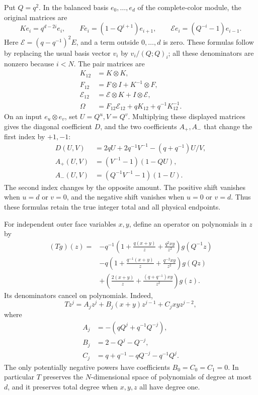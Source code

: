 Put \(Q=q^2\). In the balanced basis \(e_0,\ldots,e_d\) of the
complete-color module, the original matrices are
\[
 K e_i=q^{d-2i}e_i,\qquad
 F e_i=(1-Q^{i+1})e_{i+1},\qquad
 \mathcal E e_i=(Q^{-i}-1)e_{i-1}.
\]
Here \(\mathcal E=(q-q^{-1})^2E\), and a term outside
\(0,\ldots,d\) is zero. These formulas follow by replacing the
usual basis vector \(v_i\) by \(v_i/(Q;Q)_i\); all these
denominators are nonzero because \(i<N\). The pair matrices are
\[
 \begin{split}
 K_{12}&=K\otimes K,\\
 F_{12}&=F\otimes I+K^{-1}\otimes F,\\
 \mathcal E_{12}&=\mathcal E\otimes K+I\otimes\mathcal E,\\
 \Omega&=F_{12}\mathcal E_{12}
                     +qK_{12}+q^{-1}K_{12}^{-1}.
 \end{split}
\]
On an input \(e_u\otimes e_v\), set \(U=Q^u,V=Q^v\).
Multiplying these displayed matrices gives the diagonal coefficient
\(D\), and the two coefficients \(A_+,A_-\) that change the first
index by \(+1,-1\):
\begin{equation}\label{uf:casimir-three-entries}
\begin{split}
 D(U,V)&=2qU+2q^{-1}V^{-1}-(q+q^{-1})U/V,\\
 A_+(U,V)&=(V^{-1}-1)(1-QU),\\
 A_-(U,V)&=(Q^{-1}V^{-1}-1)(1-U).
\end{split}
\end{equation}
The second index changes by the opposite amount. The positive shift
vanishes when \(u=d\) or \(v=0\), and the negative shift vanishes
when \(u=0\) or \(v=d\). Thus these formulas retain the true
integer total and all physical endpoints.

For independent outer face variables \(x,y\), define an operator on
polynomials in \(z\) by
\begin{equation}\label{uf:face-difference-operator}
\begin{split}
 (Tg)(z)={}&-q^{-1}
   \left(1+\frac{q(x+y)}z+\frac{q^2xy}{z^2}\right)g(Q^{-1}z)\\
 &-q\left(1+\frac{q^{-1}(x+y)}z
                     +\frac{q^{-2}xy}{z^2}\right)g(Qz)\\
 &+\left(\frac{2(x+y)}z
                 +\frac{(q+q^{-1})xy}{z^2}\right)g(z).
\end{split}
\end{equation}
Its denominators cancel on polynomials. Indeed,
\[
 Tz^j=A_jz^j+B_j(x+y)z^{j-1}+C_jxyz^{j-2},
\]
where
\[
 \begin{split}
 A_j&=-(qQ^j+q^{-1}Q^{-j}),\\
 B_j&=2-Q^j-Q^{-j},\\
 C_j&=q+q^{-1}-qQ^{-j}-q^{-1}Q^j.
 \end{split}
\]
The only potentially negative powers have coefficients
\(B_0=C_0=C_1=0\). In particular \(T\) preserves the
\(N\)-dimensional space of polynomials of degree at most \(d\),
and it preserves total degree when \(x,y,z\) all have degree one.

